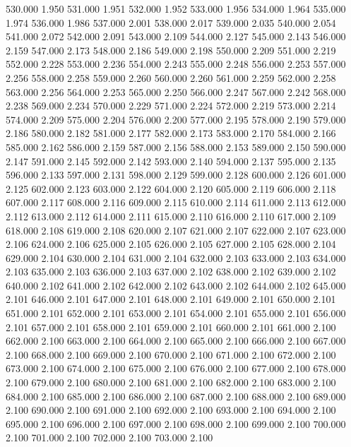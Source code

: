 530.000 1.950 
531.000 1.951 
532.000 1.952 
533.000 1.956 
534.000 1.964 
535.000 1.974 
536.000 1.986 
537.000 2.001 
538.000 2.017 
539.000 2.035 
540.000 2.054 
541.000 2.072 
542.000 2.091 
543.000 2.109 
544.000 2.127 
545.000 2.143 
546.000 2.159 
547.000 2.173 
548.000 2.186 
549.000 2.198 
550.000 2.209 
551.000 2.219 
552.000 2.228 
553.000 2.236 
554.000 2.243 
555.000 2.248 
556.000 2.253 
557.000 2.256 
558.000 2.258 
559.000 2.260 
560.000 2.260 
561.000 2.259 
562.000 2.258 
563.000 2.256 
564.000 2.253 
565.000 2.250 
566.000 2.247 
567.000 2.242 
568.000 2.238 
569.000 2.234 
570.000 2.229 
571.000 2.224 
572.000 2.219 
573.000 2.214 
574.000 2.209 
575.000 2.204 
576.000 2.200 
577.000 2.195 
578.000 2.190 
579.000 2.186 
580.000 2.182 
581.000 2.177 
582.000 2.173 
583.000 2.170 
584.000 2.166 
585.000 2.162 
586.000 2.159 
587.000 2.156 
588.000 2.153 
589.000 2.150 
590.000 2.147 
591.000 2.145 
592.000 2.142 
593.000 2.140 
594.000 2.137 
595.000 2.135 
596.000 2.133 
597.000 2.131 
598.000 2.129 
599.000 2.128 
600.000 2.126 
601.000 2.125 
602.000 2.123 
603.000 2.122 
604.000 2.120 
605.000 2.119 
606.000 2.118 
607.000 2.117 
608.000 2.116 
609.000 2.115 
610.000 2.114 
611.000 2.113 
612.000 2.112 
613.000 2.112 
614.000 2.111 
615.000 2.110 
616.000 2.110 
617.000 2.109 
618.000 2.108 
619.000 2.108 
620.000 2.107 
621.000 2.107 
622.000 2.107 
623.000 2.106 
624.000 2.106 
625.000 2.105 
626.000 2.105 
627.000 2.105 
628.000 2.104 
629.000 2.104 
630.000 2.104 
631.000 2.104 
632.000 2.103 
633.000 2.103 
634.000 2.103 
635.000 2.103 
636.000 2.103 
637.000 2.102 
638.000 2.102 
639.000 2.102 
640.000 2.102 
641.000 2.102 
642.000 2.102 
643.000 2.102 
644.000 2.102 
645.000 2.101 
646.000 2.101 
647.000 2.101 
648.000 2.101 
649.000 2.101 
650.000 2.101 
651.000 2.101 
652.000 2.101 
653.000 2.101 
654.000 2.101 
655.000 2.101 
656.000 2.101 
657.000 2.101 
658.000 2.101 
659.000 2.101 
660.000 2.101 
661.000 2.100 
662.000 2.100 
663.000 2.100 
664.000 2.100 
665.000 2.100 
666.000 2.100 
667.000 2.100 
668.000 2.100 
669.000 2.100 
670.000 2.100 
671.000 2.100 
672.000 2.100 
673.000 2.100 
674.000 2.100 
675.000 2.100 
676.000 2.100 
677.000 2.100 
678.000 2.100 
679.000 2.100 
680.000 2.100 
681.000 2.100 
682.000 2.100 
683.000 2.100 
684.000 2.100 
685.000 2.100 
686.000 2.100 
687.000 2.100 
688.000 2.100 
689.000 2.100 
690.000 2.100 
691.000 2.100 
692.000 2.100 
693.000 2.100 
694.000 2.100 
695.000 2.100 
696.000 2.100 
697.000 2.100 
698.000 2.100 
699.000 2.100 
700.000 2.100 
701.000 2.100 
702.000 2.100 
703.000 2.100 
